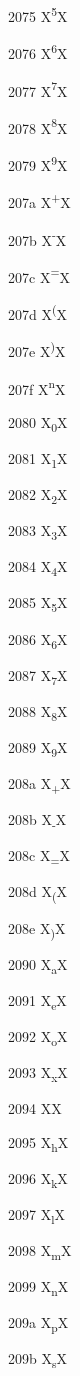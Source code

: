 \documentclass[11pt]{article}
\begin{document}
2075 X{\textsuperscript{5}}X

2076 X{\textsuperscript{6}}X

2077 X{\textsuperscript{7}}X

2078 X{\textsuperscript{8}}X

2079 X{\textsuperscript{9}}X

207a X{\textsuperscript{+}}X

207b X{\textsuperscript{-}}X

207c X{\textsuperscript{=}}X

207d X{\textsuperscript{(}}X

207e X{\textsuperscript{)}}X

207f X{\textsuperscript{n}}X

2080 X{\textsubscript{0}}X

2081 X{\textsubscript{1}}X

2082 X{\textsubscript{2}}X

2083 X{\textsubscript{3}}X

2084 X{\textsubscript{4}}X

2085 X{\textsubscript{5}}X

2086 X{\textsubscript{6}}X

2087 X{\textsubscript{7}}X

2088 X{\textsubscript{8}}X

2089 X{\textsubscript{9}}X

208a X{\textsubscript{+}}X

208b X{\textsubscript{-}}X

208c X{\textsubscript{=}}X

208d X{\textsubscript{(}}X

208e X{\textsubscript{)}}X

2090 X{\textsubscript{a}}X

2091 X{\textsubscript{e}}X

2092 X{\textsubscript{o}}X

2093 X{\textsubscript{x}}X

2094 X{\textsubscript{\textschwa}}X

2095 X{\textsubscript{h}}X

2096 X{\textsubscript{k}}X

2097 X{\textsubscript{l}}X

2098 X{\textsubscript{m}}X

2099 X{\textsubscript{n}}X

209a X{\textsubscript{p}}X

209b X{\textsubscript{s}}X
\end{document}
